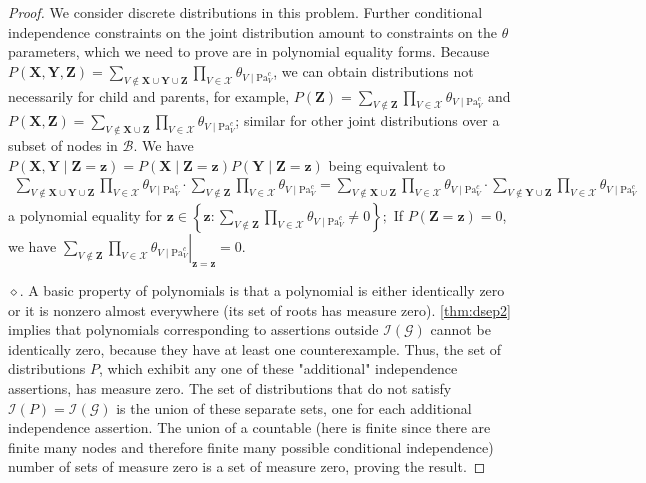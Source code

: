\documentclass{article}
\begin{document}
\begin{proof}
We consider discrete distributions in this problem. Further conditional independence constraints on the joint distribution amount to constraints on the $\theta$ parameters, which we need to prove are in polynomial equality forms. Because $P( \boldsymbol{X},  \boldsymbol{Y},  \boldsymbol{Z})=\sum_{V \notin  \boldsymbol{X} \cup  \boldsymbol{Y} \cup  \boldsymbol{Z}} \prod_{V \in \mathcal{X}} \theta_{V \mid \mathrm{Pa}_{V}^{c}}$, we can obtain distributions not necessarily for child and parents, for example, $P( \boldsymbol{Z})=\sum_{V \notin  \boldsymbol{Z}} \prod_{V \in \mathcal{X}} \theta_{V \mid \mathrm{Pa}_{V}^{c}}$ and $P( \boldsymbol{X},  \boldsymbol{Z})=\sum_{V \notin  \boldsymbol{X} \cup  \boldsymbol{Z}} \prod_{V \in \mathcal{X}} \theta_{V \mid \mathrm{Pa}_{V}^{c}}$; similar for other joint distributions over a subset of nodes in $\mathcal{B}$. We have $P( \boldsymbol{X},  \boldsymbol{Y} \mid  \boldsymbol{Z}= \boldsymbol{z})=P( \boldsymbol{X} \mid  \boldsymbol{Z}= \boldsymbol{z}) P( \boldsymbol{Y} \mid  \boldsymbol{Z}= \boldsymbol{z})$ being equivalent to
\begin{align*}
\sum_{V \notin  \boldsymbol{X} \cup  \boldsymbol{Y} \cup  \boldsymbol{Z}} \prod_{V \in \mathcal{X}} \theta_{V \mid \mathrm{Pa}_{V}^{c}} \cdot \sum_{V \notin  \boldsymbol{Z}} \prod_{V \in \mathcal{X}} \theta_{V \mid \mathrm{Pa}_{V}^{c}}=\sum_{V \notin  \boldsymbol{X} \cup  \boldsymbol{Z}} \prod_{V \in \mathcal{X}} \theta_{V \mid \mathrm{Pa}_{V}^{c}} \cdot \sum_{V \notin  \boldsymbol{Y} \cup  \boldsymbol{Z}} \prod_{V \in \mathcal{X}} \theta_{V \mid \mathrm{Pa}_{V}^{c}}
\end{align*}
a polynomial equality for $ \boldsymbol{z} \in\left\{ \boldsymbol{z}: \sum_{V \notin  \boldsymbol{Z}} \prod_{V \in \mathcal{X}} \theta_{V \mid \mathrm{Pa}_{V}^{c}} \neq 0\right\} ;$ If $P( \boldsymbol{Z}= \boldsymbol{z})=0$, we have $\left.\sum_{V \notin  \boldsymbol{Z}} \prod_{V \in \mathcal{X}} \theta_{V \mid \mathrm{Pa}_{V}^{c}}\right|_{ \boldsymbol{z}= \boldsymbol{z}}=0 .$

$\diamond$. A basic property of polynomials is that a polynomial is either identically zero or it is nonzero almost everywhere (its set of roots has measure zero). \cref{thm:dsep2}  implies that polynomials corresponding to assertions outside $\mathcal{I}(\mathcal{G})$ cannot be identically zero, because they have at least one counterexample. Thus, the set of distributions $P$, which exhibit any one of these "additional" independence assertions, has measure zero. The set of distributions that do not satisfy $\mathcal{I}(P)=\mathcal{I}(\mathcal{G})$ is the union of these separate sets, one for each additional independence assertion. The union of a countable (here is finite since there are finite many nodes and therefore finite many possible conditional independence) number of sets of measure zero is a set of measure zero, proving the result.
\end{proof}
\end{document}
